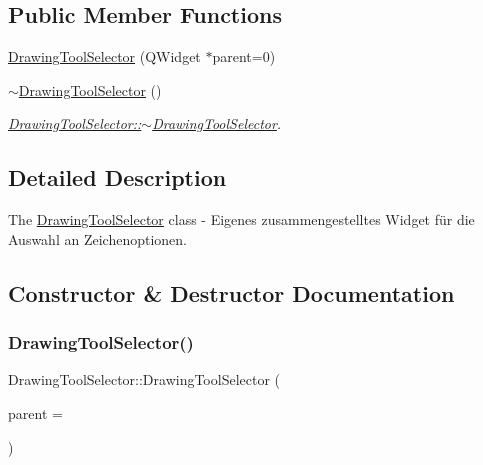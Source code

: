 \subsection*{Public Member Functions}
\begin{DoxyCompactItemize}
\item 
\hyperlink{class_drawing_tool_selector_a04f21c51c1c8eefe90c7974d1551ba7e}{Drawing\+Tool\+Selector} (Q\+Widget $\ast$parent=0)
\item 
\hyperlink{class_drawing_tool_selector_ad5f2e810c40bbeb995711860f6a22394}{$\sim$\+Drawing\+Tool\+Selector} ()
\begin{DoxyCompactList}\small\item\em \hyperlink{class_drawing_tool_selector_ad5f2e810c40bbeb995711860f6a22394}{Drawing\+Tool\+Selector\+::$\sim$\+Drawing\+Tool\+Selector}. \end{DoxyCompactList}\end{DoxyCompactItemize}


\subsection{Detailed Description}
The \hyperlink{class_drawing_tool_selector}{Drawing\+Tool\+Selector} class -\/ Eigenes zusammengestelltes Widget für die Auswahl an Zeichenoptionen. 

\subsection{Constructor \& Destructor Documentation}
\mbox{\label{class_drawing_tool_selector_a04f21c51c1c8eefe90c7974d1551ba7e}} 
\subsubsection{\texorpdfstring{Drawing\+Tool\+Selector()}{DrawingToolSelector()}}
{\footnotesize\ttfamily Drawing\+Tool\+Selector\+::\+Drawing\+Tool\+Selector (\begin{DoxyParamCaption}\item[{Q\+Widget $\ast$}]{parent = {} }\end{DoxyParamCaption})\hspace{0.3cm}{\ttfamily [explicit]}}

